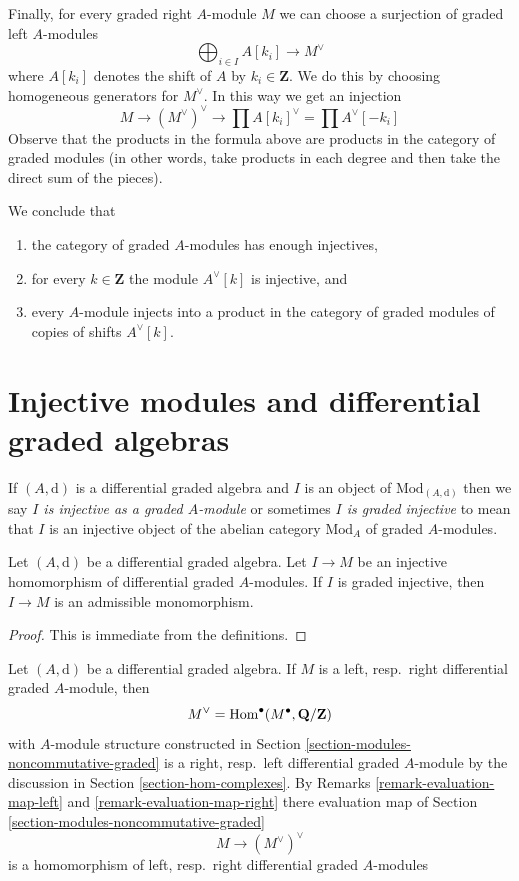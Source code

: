 \medskip\noindent
Finally, for every graded right $A$-module $M$ we can choose a surjection
of graded left $A$-modules
$$
\bigoplus\nolimits_{i \in I} A[k_i] \to M^\vee
$$
where $A[k_i]$ denotes the shift of $A$ by $k_i \in \mathbf{Z}$.
We do this by choosing homogeneous generators for $M^\vee$.
In this way we get an injection
$$
M \to (M^\vee)^\vee \to \prod A[k_i]^\vee = \prod A^\vee[-k_i]
$$
Observe that the products in the formula above are products in the
category of graded modules (in other words, take products in each degree
and then take the direct sum of the pieces).

\medskip\noindent
We conclude that
\begin{enumerate}
\item the category of graded $A$-modules has enough injectives,
\item for every $k \in \mathbf{Z}$ the module $A^\vee[k]$ is injective, and
\item every $A$-module injects into a product in the category of graded
modules of copies of shifts $A^\vee[k]$.
\end{enumerate}





\section{Injective modules and differential graded algebras}
\label{section-modules-noncommutative-differential-graded}

\noindent
If $(A, \text{d})$ is a differential graded algebra and $I$ is
an object of $\text{Mod}_{(A, \text{d})}$ then we say
{\it $I$ is injective as a graded $A$-module} or sometimes
{\it $I$ is graded injective} to mean
that $I$ is an injective object of the abelian category $\text{Mod}_A$
of graded $A$-modules.

\begin{lemma}
\label{lemma-source-graded-injective}
Let $(A, \text{d})$ be a differential graded algebra.
Let $I \to M$ be an injective homomorphism of differential graded
$A$-modules. If $I$ is graded injective, then
$I \to M$ is an admissible monomorphism.
\end{lemma}

\begin{proof}
This is immediate from the definitions.
\end{proof}

\noindent
Let $(A, \text{d})$ be a differential graded algebra. If $M$ is a
left, resp.\ right differential graded $A$-module, then
$$
M^\vee = \mathop{\mathrm{Hom}}\nolimits^\bullet(M^\bullet, \mathbf{Q}/\mathbf{Z})
$$
with $A$-module structure constructed in
Section \ref{section-modules-noncommutative-graded} is a
right, resp.\ left differential graded $A$-module by the
discussion in Section \ref{section-hom-complexes}.
By Remarks
\ref{remark-evaluation-map-left} and \ref{remark-evaluation-map-right}
there evaluation map of Section \ref{section-modules-noncommutative-graded}
$$
M \longrightarrow (M^\vee)^\vee
$$
is a homomorphism of left, resp.\ right differential graded $A$-modules

